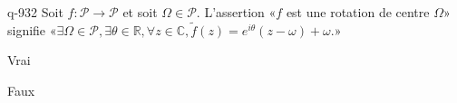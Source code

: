 \begin{truefalse}{q-932}
Soit $f:\mathcal P\to \mathcal P$ et soit $\Omega\in\mathcal P$. L'assertion «$f$ est une rotation de centre $\Omega$» signifie «$\exists \Omega\in\mathcal P, \exists \theta\in\mathbb R, \forall z\in\mathbb C, \tilde f(z)=e^{i\theta}(z-\omega)+\omega$.»
\item Vrai
\item* Faux
\end{truefalse}

